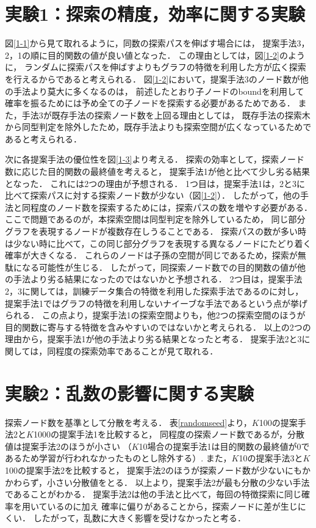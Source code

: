 \section{実験1：探索の精度，効率に関する実験}
図\ref{1-1}から見て取れるように，同数の探索パスを伸ばす場合には，
提案手法3，2，1の順に目的関数の値が良い値となった．
この理由としては，図\ref{1-2}のように，
ランダムに探索パスを伸ばすよりもグラフの特徴を利用した方が広く探索を行えるからであると考えられる．
図\ref{1-2}において，提案手法3のノード数が他の手法より莫大に多くなるのは，
前述したとおり子ノードのboundを利用して確率を振るためには予め全ての子ノードを探索する必要があるためである．
また，手法3が既存手法の探索ノード数を上回る理由としては，
既存手法の探索木から同型判定を除外したため，既存手法よりも探索空間が広くなっているためであると考えられる．

次に各提案手法の優位性を図\ref{1-3}より考える．
探索の効率として，探索ノード数に応じた目的関数の最終値を考えると，
提案手法1が他と比べて少し劣る結果となった．
これには2つの理由が予想される．
1つ目は，提案手法1は，2と3に比べて探索パスに対する探索ノード数が少ない（図\ref{1-2}）．
したがって，他の手法と同程度のノード数を探索するためには，探索パスの数を増やす必要がある．
ここで問題であるのが，本探索空間は同型判定を除外しているため，
同じ部分グラフを表現するノードが複数存在しうることである．
探索パスの数が多い時は少ない時に比べて，この同じ部分グラフを表現する異なるノードにたどり着く確率が大きくなる．
これらのノードは子孫の空間が同じであるため，探索が無駄になる可能性が生じる．
したがって，同探索ノード数での目的関数の値が他の手法より劣る結果になったのではないかと予想される．
2つ目は，提案手法2，3に関しては，訓練データ集合の特徴を利用した探索手法であるのに対し，
提案手法1ではグラフの特徴を利用しないナイーブな手法であるという点が挙げられる．
この点より，提案手法1の探索空間よりも，他2つの探索空間のほうが
目的関数に寄与する特徴を含みやすいのではないかと考えられる．
以上の2つの理由から，提案手法1が他の手法より劣る結果となったと考る．
提案手法2と3に関しては，同程度の探索効率であることが見て取れる．

\section{実験2：乱数の影響に関する実験}
探索ノード数を基準として分散を考える．
表\ref{randomseed}より，$K$100の提案手法2と$K$1000の提案手法1を比較すると，
同程度の探索ノード数であるが，分散値は提案手法2のほうが小さい
（$K$10場合の提案手法1は目的関数の最終値が0であるため学習が行われなかったものとし除外する）.
また，$K$10の提案手法3と$K$100の提案手法2を比較すると，
提案手法2のほうが探索ノード数が少ないにもかかわらず，小さい分散値をとる．
以上より，提案手法2が最も分散の少ない手法であることがわかる．
提案手法2は他の手法と比べて，毎回の特徴探索に同じ確率を用いているのに加え
確率に偏りがあることから，探索ノードに差が生じにくい．
したがって，乱数に大きく影響を受けなかったと考る．

